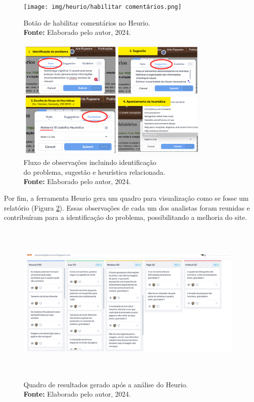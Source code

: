 \begin{figure}[H]
    \centering
    \begin{minipage}[b]{0.48\textwidth}
        \centering
        \texttt{[image: img/heurio/habilitar comentários.png]}
        \caption{Botão de habilitar comentários no Heurio.  \\
            \textbf{Fonte:} Elaborado pelo autor, 2024.}
        \label{fig:comentario heurio}
    \end{minipage}
    \hfill
    \begin{minipage}[b]{0.48\textwidth}
        \centering
        \includegraphics[height=6cm, keepaspectratio]{img/heurio/fluxo heurio.png}
        \caption{Fluxo de observações incluindo identificação \\do problema, sugestão e heurística relacionada. \\
            \textbf{Fonte:} Elaborado pelo autor, 2024.}
        \label{fig:fluxo heurio}
    \end{minipage}
\end{figure}

Por fim, a ferramenta Heurio gera um quadro para visualização como se fosse um relatório (Figura \ref{fig:quadro resultados}). Essas observações de cada um dos analistas foram reunidas e contribuíram para a identificação do problema, possibilitando a melhoria do site. 
\begin{figure}[H]
    \centering
    \includegraphics[height=8cm, keepaspectratio]{img/heurio/quadro resultados.png}
    \caption{ Quadro de resultados gerado após a análise do Heurio. \\
        \textbf{Fonte:} Elaborado pelo autor, 2024.}
    \label{fig:quadro resultados}
\end{figure}


